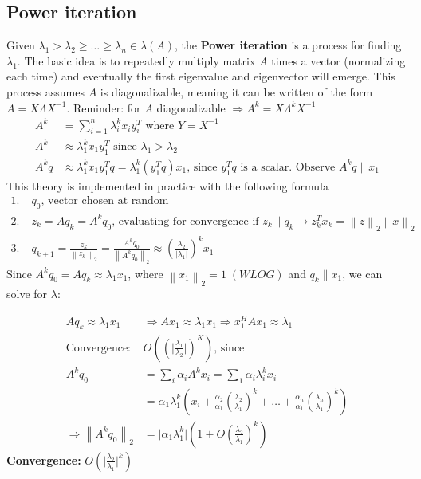 \documentclass{article}
\newcommand{\norm}[2]{\left\lVert#1\right\rVert_#2}
\newcommand{\abs}[1]{\lvert#1\rvert}
\begin{document}
\subsection{Power iteration}
Given $\lambda_1 > \lambda_2 \geq \dots \geq \lambda_n \in \lambda(A)$, the \textbf{Power iteration} is a process for finding $\lambda_1$. The basic idea is to repeatedly multiply matrix $A$ times a vector (normalizing each time) and eventually the first eigenvalue and eigenvector will emerge. This process assumes $A$ is diagonalizable, meaning it can be written of the form $A = X\Lambda X^{-1}$. Reminder: for $A$ diagonalizable $\Longrightarrow A^k = X \Lambda^k X^{-1}$
\begin{align*}
    A^k &= \sum_{i = 1}^n \lambda_i^k x_i y_i^T \textrm{ where $Y = X^{-1}$}\\
    A^k &\approx \lambda_1^kx_1y_1^T \textrm{ since } \lambda_1 > \lambda_2\\
    A^kq &\approx \lambda_1^kx_1y_1^Tq = \lambda_1^k(y_1^Tq)x_1 \textrm{, since $y_1^Tq$ is a scalar. Observe } A^kq \parallel x_1
\end{align*}
This theory is implemented in practice with the following formula
\begin{align*}
    1. \;& q_0 \textrm{, vector chosen at random}\\
    2. \;& z_k = Aq_k = A^kq_0 \textrm{, evaluating for convergence if } z_k \parallel q_k \rightarrow z_k^Tx_k = \norm{z}{2}\norm{x}{2}\\
    3. \;& q_{k+1} = \frac{z_k}{\norm{z_k}{2}} = \frac{A^kq_0}{\norm{A^kq_0}{2}} \approx (\frac{\lambda_2}{\abs{\lambda_1}})^kx_1
\end{align*}
Since $A^{k}q_0 = Aq_{k} \approx \lambda_1 x_1$, where $\norm{x_1}{2} = 1 \; (WLOG)$ and $q_k \parallel x_1$, we can solve for $\lambda$:

\begin{align*}
    Aq_k \approx \lambda_1 x_1 &\Longrightarrow Ax_1 \approx \lambda_1x_1 \Rightarrow x_1^HAx_1 \approx \lambda_1\\
    \textrm{Convergence: } &O((\abs{\frac{\lambda_1}{\lambda_2}})^K) \textrm{, since}\\
    A^kq_0 &= \sum_i \alpha_i A^k x_i = \sum_1 \alpha_i \lambda_i^k x_i\\
    &= \alpha_1\lambda_1^k(x_i + \frac{\alpha_2}{\alpha_1}(\frac{\lambda_2}{\lambda_1})^k + \dots + \frac{\alpha_n}{\alpha_1}(\frac{\lambda_n}{\lambda_1})^k) \\
    \Longrightarrow \norm{A^kq_0}{2} &= \abs{\alpha_1\lambda_1^k}(1 + O(\frac{\lambda_2}{\lambda_1})^k) 
\end{align*}
\textbf{Convergence:} $O(\abs{\frac{\lambda_2}{\lambda_1}}^k)$
\end{document}
